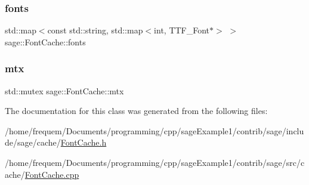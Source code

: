 \subsubsection{\texorpdfstring{fonts}{fonts}}
{\footnotesize\ttfamily std\+::map$<$const std\+::string, std\+::map$<$int, T\+T\+F\+\_\+\+Font$\ast$$>$ $>$ sage\+::\+Font\+Cache\+::fonts\hspace{0.3cm}{\ttfamily [private]}}

\mbox{\label{classsage_1_1FontCache_aa60c136f3ccb1516e80321ceea56cf53}} 
\subsubsection{\texorpdfstring{mtx}{mtx}}
{\footnotesize\ttfamily std\+::mutex sage\+::\+Font\+Cache\+::mtx\hspace{0.3cm}{\ttfamily [private]}}



The documentation for this class was generated from the following files\+:\begin{DoxyCompactItemize}
\item 
/home/frequem/\+Documents/programming/cpp/sage\+Example1/contrib/sage/include/sage/cache/\mbox{\hyperlink{FontCache_8h}{Font\+Cache.\+h}}\item 
/home/frequem/\+Documents/programming/cpp/sage\+Example1/contrib/sage/src/cache/\mbox{\hyperlink{FontCache_8cpp}{Font\+Cache.\+cpp}}\end{DoxyCompactItemize}
